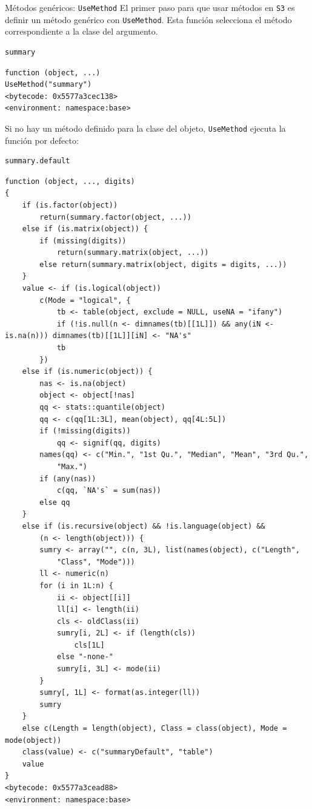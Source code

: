 \documentclass[xcolor={usenames,svgnames,dvipsnames}]{beamer}
\begin{document}
\begin{frame}[label={sec:orgc756c88},fragile]{Métodos genéricos: \texttt{UseMethod}}
 El primer paso para que usar métodos en \texttt{S3} es definir un método genérico con \texttt{UseMethod}. Esta función selecciona el método correspondiente a la clase del argumento.
\lstset{language=r,label= ,caption= ,captionpos=b,numbers=none}
\begin{lstlisting}
summary
\end{lstlisting}

\begin{verbatim}
function (object, ...) 
UseMethod("summary")
<bytecode: 0x5577a3cec138>
<environment: namespace:base>
\end{verbatim}


Si no hay un método definido para la clase del objeto, \texttt{UseMethod} ejecuta la función por defecto:
\lstset{language=r,label= ,caption= ,captionpos=b,numbers=none}
\begin{lstlisting}
summary.default
\end{lstlisting}

\begin{verbatim}
function (object, ..., digits) 
{
    if (is.factor(object)) 
        return(summary.factor(object, ...))
    else if (is.matrix(object)) {
        if (missing(digits)) 
            return(summary.matrix(object, ...))
        else return(summary.matrix(object, digits = digits, ...))
    }
    value <- if (is.logical(object)) 
        c(Mode = "logical", {
            tb <- table(object, exclude = NULL, useNA = "ifany")
            if (!is.null(n <- dimnames(tb)[[1L]]) && any(iN <- is.na(n))) dimnames(tb)[[1L]][iN] <- "NA's"
            tb
        })
    else if (is.numeric(object)) {
        nas <- is.na(object)
        object <- object[!nas]
        qq <- stats::quantile(object)
        qq <- c(qq[1L:3L], mean(object), qq[4L:5L])
        if (!missing(digits)) 
            qq <- signif(qq, digits)
        names(qq) <- c("Min.", "1st Qu.", "Median", "Mean", "3rd Qu.", 
            "Max.")
        if (any(nas)) 
            c(qq, `NA's` = sum(nas))
        else qq
    }
    else if (is.recursive(object) && !is.language(object) && 
        (n <- length(object))) {
        sumry <- array("", c(n, 3L), list(names(object), c("Length", 
            "Class", "Mode")))
        ll <- numeric(n)
        for (i in 1L:n) {
            ii <- object[[i]]
            ll[i] <- length(ii)
            cls <- oldClass(ii)
            sumry[i, 2L] <- if (length(cls)) 
                cls[1L]
            else "-none-"
            sumry[i, 3L] <- mode(ii)
        }
        sumry[, 1L] <- format(as.integer(ll))
        sumry
    }
    else c(Length = length(object), Class = class(object), Mode = mode(object))
    class(value) <- c("summaryDefault", "table")
    value
}
<bytecode: 0x5577a3cead88>
<environment: namespace:base>
\end{verbatim}
\end{frame}
\end{document}
